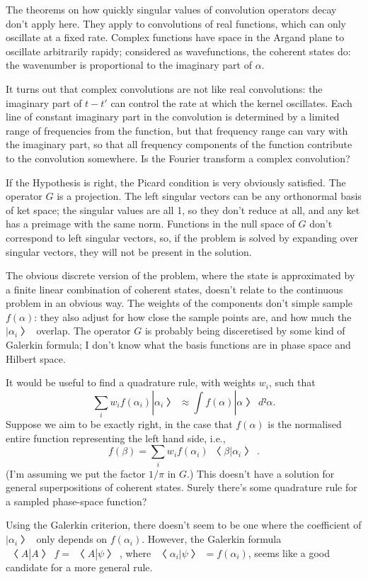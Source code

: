 The theorems on how quickly singular values of convolution operators decay don't apply here.  They apply to convolutions of real functions, which can only oscillate at a fixed rate.  Complex functions have space in the Argand plane to oscillate arbitrarily rapidy; considered as wavefunctions, the coherent states do: the wavenumber is proportional to the imaginary part of $α$.

It turns out that complex convolutions are not like real convolutions: the imaginary part of $t-t'$ can control the rate at which the kernel oscillates.  Each line of constant imaginary part in the convolution is determined by a limited range of frequencies from the function, but that frequency range can vary with the imaginary part, so that all frequency components of the function contribute to the convolution somewhere.  Is the Fourier transform a complex convolution?

If the Hypothesis is right, the Picard condition is very obviously satisfied.  The operator $G$ is a projection.  The left singular vectors can be any orthonormal basis of ket space; the singular values are all 1, so they don't reduce at all, and any ket has a preimage with the same norm.  Functions in the null space of $G$ don't correspond to left singular vectors, so, if the problem is solved by expanding over singular vectors, they will not be present in the solution. 


The obvious discrete version of the problem, where the state is approximated by a finite linear combination of coherent states, doesn't relate to the continuous problem in an obvious way.  The weights of the components don't simple sample $f(α)$: they also adjust for how close the sample points are, and how much the $|α_i〉$ overlap.  The operator $G$ is probably being disceretised by some kind of Galerkin formula; I don't know what the basis functions are in phase space and Hilbert space.

It would be useful to find a quadrature rule, with weights $w_i$, such that 
$$∑_i w_if(α_i)|α_i〉≈\int f(α)|α〉d²α.$$
Suppose we aim to be exactly right, in the case that $f(α)$ is the normalised entire function representing the left hand side, i.e.,
$$f(β)=∑_i w_if(α_i)〈β|α_i〉.$$
(I'm assuming we put the factor $1/π$ in $G$.)  This doesn't have a solution for general superpositions of coherent states.  Surely there's some quadrature rule for a sampled phase-space function?

Using the Galerkin criterion, there doesn't seem to be one where the coefficient of $|α_i〉$ only depends on $f(α_i)$.  However, the Galerkin formula $〈A|A〉f=〈A|ψ〉$, where $〈α_i|ψ〉=f(α_i)$, seems like a good candidate for a more general rule.

